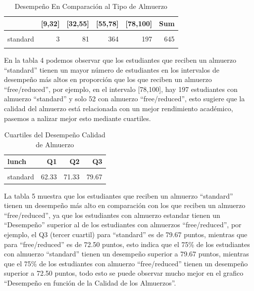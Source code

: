 \documentclass[
]{article}
\begin{document}
\begin{table}[!h]
\centering
\caption{\label{tab:tabla2 }Desempeño En Comparación al Tipo de Almuerzo}
\centering
\begin{tabular}[t]{lrrrrr}
\toprule
  & {}[9,32] & {}[32,55] & {}[55,78] & {}[78,100] & Sum\\
\midrule
\cellcolor{gray!10}{free/reduced} & \cellcolor{gray!10}{11} & \cellcolor{gray!10}{96} & \cellcolor{gray!10}{196} & \cellcolor{gray!10}{52} & \cellcolor{gray!10}{355}\\
standard & 3 & 81 & 364 & 197 & 645\\
\cellcolor{gray!10}{Sum} & \cellcolor{gray!10}{14} & \cellcolor{gray!10}{177} & \cellcolor{gray!10}{560} & \cellcolor{gray!10}{249} & \cellcolor{gray!10}{1000}\\
\bottomrule
\end{tabular}
\end{table}

En la tabla 4 podemos observar que los estudiantes que reciben un
almuerzo ``standard'' tienen un mayor número de estudiantes en los
intervalos de desempeño más altos en proporción que los que reciben un
almuerzo ``free/reduced'', por ejemplo, en el intervalo {[}78,100{]},
hay 197 estudiantes con almuerzo ``standard'' y solo 52 con almuerzo
``free/reduced'', esto sugiere que la calidad del almuerzo está
relacionada con un mejor rendimiento académico, pasemos a nalizar mejor
esto mediante cuartiles.

\begin{table}[!h]
\centering
\caption{\label{tab:cuartiles2}Cuartiles del Desempeño Calidad de Almuerzo}
\centering
\begin{tabular}[t]{lrrr}
\toprule
lunch & Q1 & Q2 & Q3\\
\midrule
\cellcolor{gray!10}{free/reduced} & \cellcolor{gray!10}{52.84} & \cellcolor{gray!10}{62.67} & \cellcolor{gray!10}{72.50}\\
standard & 62.33 & 71.33 & 79.67\\
\bottomrule
\end{tabular}
\end{table}

La tabla 5 muestra que los estudiantes que reciben un almuerzo
``standard'' tienen un desempeño más alto en comparación con los que
reciben un almuerzo ``free/reduced'', ya que los estudiantes con
almuerzo estandar tienen un ``Desempeño'' superior al de los estudiantes
con almuerzos ``free/reduced'', por ejemplo, el Q3 (tercer cuartil) para
``standard'' es de 79.67 puntos, mientras que para ``free/reduced'' es
de 72.50 puntos, esto indica que el 75\% de los estudiantes con almuerzo
``standard'' tienen un desempeño superior a 79.67 puntos, mientras que
el 75\% de los estudiantes con almuerzo ``free/reduced'' tienen un
desempeño superior a 72.50 puntos, todo esto se puede observar mucho
mejor en el grafico ``Desempeño en función de la Calidad de los
Almuerzos''.
\end{document}
